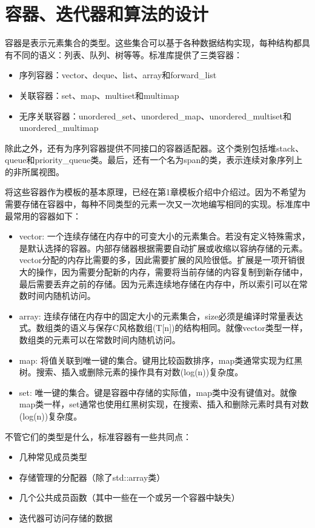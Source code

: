 \section{容器、迭代器和算法的设计}
容器是表示元素集合的类型。这些集合可以基于各种数据结构实现，每种结构都具有不同的语义：列表、队列、树等等。标准库提供了三类容器：

\begin{itemize}
  \item 序列容器：vector、deque、list、array和forward_list
  \item 关联容器：set、map、multiset和multimap
  \item 无序关联容器：unordered_set、unordered_map、unordered_multiset和unordered_multimap
\end{itemize}

除此之外，还有为序列容器提供不同接口的容器适配器。这个类别包括堆stack、queue和priority_queue类。最后，还有一个名为span的类，表示连续对象序列上的非所属视图。

将这些容器作为模板的基本原理，已经在第1章模板介绍中介绍过。因为不希望为需要存储在容器中，每种不同类型的元素一次又一次地编写相同的实现。标准库中最常用的容器如下：

\begin{itemize}
  \item vector: 一个连续存储在内存中的可变大小的元素集合。若没有定义特殊需求，是默认选择的容器。内部存储器根据需要自动扩展或收缩以容纳存储的元素。vector分配的内存比需要的多，因此需要扩展的风险很低。扩展是一项开销很大的操作，因为需要分配新的内存，需要将当前存储的内容复制到新存储中，最后需要丢弃之前的存储。因为元素连续地存储在内存中，所以索引可以在常数时间内随机访问。
  \item array: 连续存储在内存中的固定大小的元素集合，size必须是编译时常量表达式。数组类的语义与保存C风格数组(T[n])的结构相同。就像vector类型一样，数组类的元素可以在常数时间内随机访问。
  \item map: 将值关联到唯一键的集合。键用比较函数排序，map类通常实现为红黑树。搜索、插入或删除元素的操作具有对数(log(n))复杂度。
  \item set: 唯一键的集合。键是容器中存储的实际值，map类中没有键值对。就像map类一样，set通常也使用红黑树实现，在搜索、插入和删除元素时具有对数(log(n))复杂度。
\end{itemize}

不管它们的类型是什么，标准容器有一些共同点：

\begin{itemize}
  \item 几种常见成员类型
  \item 存储管理的分配器（除了std::array类）
  \item 几个公共成员函数（其中一些在一个或另一个容器中缺失）
  \item 迭代器可访问存储的数据
\end{itemize}

